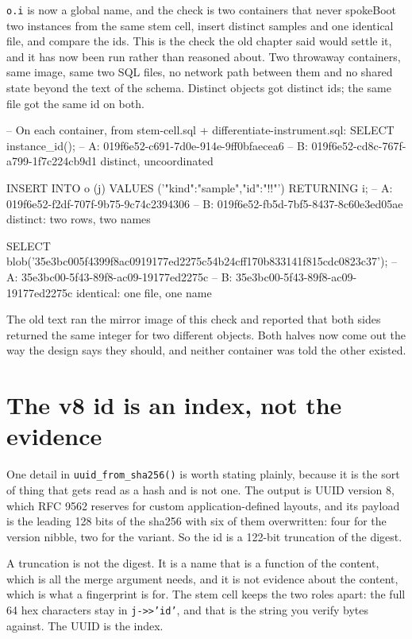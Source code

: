 \begin{Correspondence}{\texttt{o.i} is now a global name, and the check is two containers that never spoke}{Boot two instances from the same stem cell, insert distinct samples and one identical file, and compare the ids.}
This is the check the old chapter said would settle it, and it has now been run rather than reasoned about. Two throwaway containers, same image, same two SQL files, no network path between them and no shared state beyond the text of the schema. Distinct objects got distinct ids; the same file got the same id on both.
\begin{Check}
-- On each container, from stem-cell.sql + differentiate-instrument.sql:
SELECT instance_id();
--   A: 019f6e52-c691-7d0e-914e-9ff0bfaecea6
--   B: 019f6e52-cd8c-767f-a799-1f7c224cb9d1     distinct, uncoordinated

INSERT INTO o (j) VALUES ('{"kind":"sample","id":"!\labSample!"}') RETURNING i;
--   A: 019f6e52-f2df-707f-9b75-9c74c2394306
--   B: 019f6e52-fb5d-7bf5-8437-8c60e3ed05ae     distinct: two rows, two names

SELECT blob('35e3bc005f4399f8ac0919177ed2275c54b24cff170b833141f815cdc0823c37');
--   A: 35e3bc00-5f43-89f8-ac09-19177ed2275c
--   B: 35e3bc00-5f43-89f8-ac09-19177ed2275c     identical: one file, one name
\end{Check}
The old text ran the mirror image of this check and reported that both sides returned the same integer for two different objects. Both halves now come out the way the design says they should, and neither container was told the other existed.
\end{Correspondence}

\section{The v8 id is an index, not the evidence}

One detail in \texttt{uuid\_from\_sha256()} is worth stating plainly, because it is the sort of thing that gets read as a hash and is not one. The output is UUID version 8, which RFC 9562 reserves for custom application-defined layouts, and its payload is the leading 128 bits of the sha256 with six of them overwritten: four for the version nibble, two for the variant. So the id is a 122-bit truncation of the digest.

A truncation is not the digest. It is a name that is a function of the content, which is all the merge argument needs, and it is not evidence about the content, which is what a fingerprint is for. The stem cell keeps the two roles apart: the full 64 hex characters stay in \texttt{j->>'id'}, and that is the string you verify bytes against. The UUID is the index.


